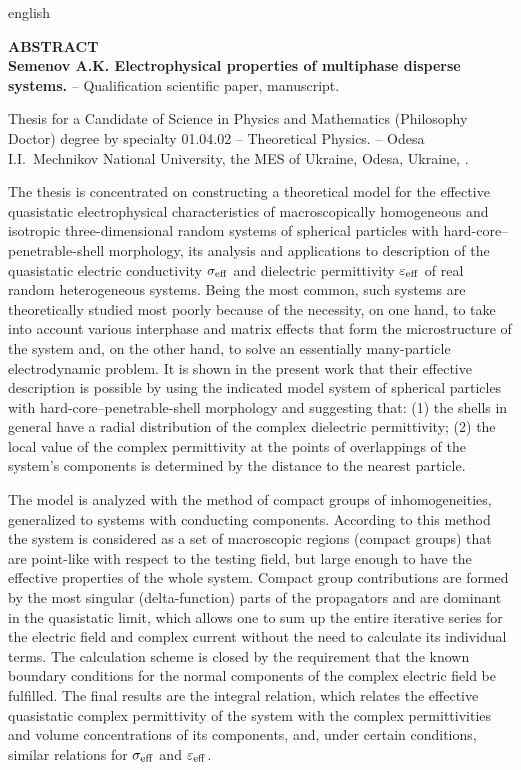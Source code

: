 \begin{otherlanguage*}{english}
\begin{center}
    {\normalfont \textbf{
    	ABSTRACT\\
    	Semenov A.K. Electrophysical properties of multiphase disperse systems.} -- Qualification scientific paper, manuscript.}
\end{center}
\vskip 5pt

Thesis for a Candidate of Science in Physics and Mathematics (Philosophy Doctor) degree by specialty 01.04.02 -- Theoretical Physics. -- Odesa I.I.~Mechnikov National University, the MES of Ukraine, Odesa, Ukraine, \the\year.

\vskip 5pt

The thesis is concentrated on constructing a theoretical model for the effective quasistatic electrophysical characteristics of macroscopically homogeneous and isotropic three-dimensional random  systems of spherical particles with hard-core--penetrable-shell morphology, its analysis and applications to description of the quasistatic electric conductivity $ \sigma_{\rm eff}$ and dielectric permittivity $\varepsilon_ {\rm eff} $ of real random heterogeneous systems.
Being the most common, such systems are theoretically  studied most poorly because of the necessity, on one hand, to take into account various interphase and matrix effects that form the microstructure of the system and, on the other hand, to solve an essentially many-particle electrodynamic problem.
It is shown in the present work that their effective description is possible by using the indicated model system of spherical particles with hard-core--penetrable-shell morphology and suggesting that: (1) the shells in general have a radial distribution of the complex dielectric permittivity; (2) the local value of the complex permittivity at the points of  overlappings of the system's components is determined by the distance to the nearest particle.

The model is analyzed with  the method of compact groups of inhomogeneities, generalized to systems with conducting components. According to this method the system is considered as a set of macroscopic regions (compact groups) that are point-like with respect to the testing field, but large enough to have the effective properties of the whole system.
Compact group contributions are formed by the most singular (delta-function) parts of the propagators and are dominant in the quasistatic limit, which allows one to sum up the entire iterative series for the electric field and complex current without the need to calculate its individual terms.
The calculation scheme is closed by the requirement that the known boundary conditions for the normal components of the complex electric field be fulfilled.
The final results are the integral relation, which relates the effective quasistatic complex permittivity of the system with the complex permittivities and volume concentrations of its components, and, under certain conditions, similar relations for $ \sigma_ {\rm eff} $ and $ \varepsilon_ {\rm eff} $.


\end{otherlanguage*}
